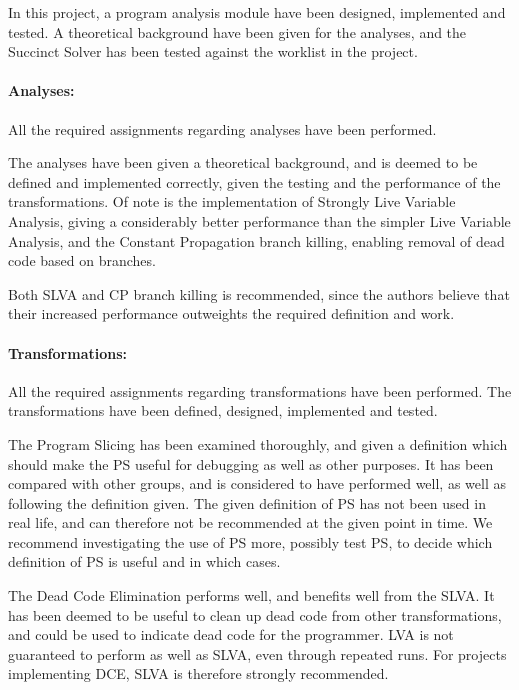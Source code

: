 
In this project, a program analysis module have been
designed, implemented and tested. A theoretical background
have been given for the analyses, and the Succinct Solver
has been tested against the worklist in the project.

\paragraph{Analyses:}

All the required assignments regarding analyses have been performed.

The analyses have been given a theoretical background,
and is deemed to be defined and implemented correctly,
given the testing and the performance of the transformations.
Of note is the implementation of Strongly Live Variable Analysis,
giving a considerably better performance than the simpler Live Variable Analysis,
and the Constant Propagation branch killing, enabling removal of dead code based on branches.

Both SLVA and CP branch killing is recommended, since the authors
believe that their increased performance outweights the required
definition and work.

\paragraph{Transformations:}

All the required assignments regarding transformations have been performed.
The transformations have been defined, designed, implemented and tested.

The Program Slicing has been examined thoroughly, and given a definition which should
make the PS useful for debugging as well as other purposes. It has
been compared with other groups, and is considered to have performed
well, as well as following the definition given. The given definition of PS has not
been used in real life, and can therefore not be recommended at the given point in time.
We recommend investigating the use of PS more, possibly test PS, to decide which
definition of PS is useful and in which cases.

The Dead Code Elimination performs well, and benefits well from the SLVA. It has
been deemed to be useful to clean up dead code from other transformations,
and could be used to indicate dead code for the programmer. LVA is not guaranteed to
perform as well as SLVA, even through repeated runs. For projects
implementing DCE, SLVA is therefore strongly recommended.

